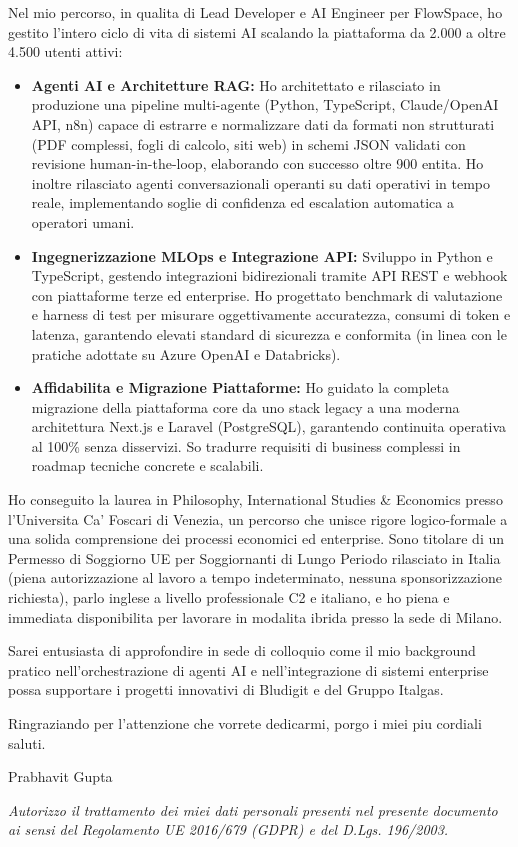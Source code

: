 \documentclass[10.5pt,a4paper]{article}
\begin{document}
Nel mio percorso, in qualita di Lead Developer e AI Engineer per FlowSpace, ho gestito l'intero ciclo di vita di sistemi AI scalando la piattaforma da 2.000 a oltre 4.500 utenti attivi:
\begin{itemize}
  \setlength{\itemsep}{1pt}
  \setlength{\parskip}{0pt}
  \item \textbf{Agenti AI e Architetture RAG:} Ho architettato e rilasciato in produzione una pipeline multi-agente (Python, TypeScript, Claude/OpenAI API, n8n) capace di estrarre e normalizzare dati da formati non strutturati (PDF complessi, fogli di calcolo, siti web) in schemi JSON validati con revisione human-in-the-loop, elaborando con successo oltre 900 entita. Ho inoltre rilasciato agenti conversazionali operanti su dati operativi in tempo reale, implementando soglie di confidenza ed escalation automatica a operatori umani.
  \item \textbf{Ingegnerizzazione MLOps e Integrazione API:} Sviluppo in Python e TypeScript, gestendo integrazioni bidirezionali tramite API REST e webhook con piattaforme terze ed enterprise. Ho progettato benchmark di valutazione e harness di test per misurare oggettivamente accuratezza, consumi di token e latenza, garantendo elevati standard di sicurezza e conformita (in linea con le pratiche adottate su Azure OpenAI e Databricks).
  \item \textbf{Affidabilita e Migrazione Piattaforme:} Ho guidato la completa migrazione della piattaforma core da uno stack legacy a una moderna architettura Next.js e Laravel (PostgreSQL), garantendo continuita operativa al 100\% senza disservizi. So tradurre requisiti di business complessi in roadmap tecniche concrete e scalabili.
\end{itemize}

Ho conseguito la laurea in Philosophy, International Studies \& Economics presso l'Universita Ca' Foscari di Venezia, un percorso che unisce rigore logico-formale a una solida comprensione dei processi economici ed enterprise. Sono titolare di un Permesso di Soggiorno UE per Soggiornanti di Lungo Periodo rilasciato in Italia (piena autorizzazione al lavoro a tempo indeterminato, nessuna sponsorizzazione richiesta), parlo inglese a livello professionale C2 e italiano, e ho piena e immediata disponibilita per lavorare in modalita ibrida presso la sede di Milano.

Sarei entusiasta di approfondire in sede di colloquio come il mio background pratico nell'orchestrazione di agenti AI e nell'integrazione di sistemi enterprise possa supportare i progetti innovativi di Bludigit e del Gruppo Italgas.

Ringraziando per l'attenzione che vorrete dedicarmi, porgo i miei piu cordiali saluti.

Prabhavit Gupta

\vspace{0.5em}
{\footnotesize \textit{Autorizzo il trattamento dei miei dati personali presenti nel presente documento ai sensi del Regolamento UE 2016/679 (GDPR) e del D.Lgs. 196/2003.}\par}
\end{document}
